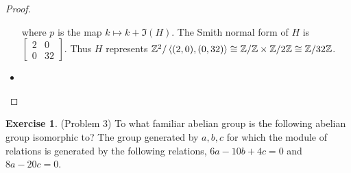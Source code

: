 \documentclass[12pt, psamsfonts]{amsart}
\theoremstyle{definition}
\newtheorem*{exer}{Exercise}
\theoremstyle{remark}
\numberwithin{equation}{section}
\begin{document}
\begin{proof}
\begin{itemize}
      \begin{center}
      \end{center}

      where $p$ is the map $k \mapsto k + \Im(H)$.
      The Smith normal form of $H$ is $\begin{bmatrix} 2 & 0 \\ 0 & 32 \end{bmatrix}$.
      Thus $H$ represents $\mathbb{Z}^2/\ev{(2, 0), (0, 32)} \cong \mathbb{Z}/\mathbb{Z} \times \mathbb{Z}/2\mathbb{Z} \cong \mathbb{Z}/32\mathbb{Z}$.
    \item
      \todo[inline,caption={}]{
      }
  \end{itemize}
\end{proof}

\begin{exer}{(Problem 3)}
  To what familiar abelian group is the following abelian group isomorphic to?
  The group generated by $a, b, c$ for which the module of relations is generated by the following relations, $6a - 10b + 4c = 0$ and $8a - 20c = 0$.
\end{exer}
\end{document}
